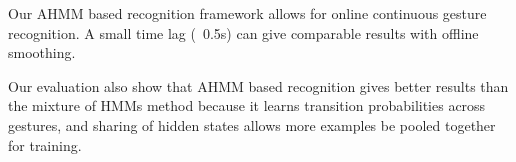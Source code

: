 \documentclass{sigchi}
\begin{document}
Our AHMM based recognition framework allows for online continuous gesture recognition. A small time lag (~0.5s) can give comparable results with offline
smoothing.

Our evaluation also show that AHMM based recognition gives better results than the mixture of HMMs method because it learns transition probabilities across gestures,
 and sharing of hidden states allows more examples be pooled together for training.


%
%
%
%
%
\balance



\end{document}
